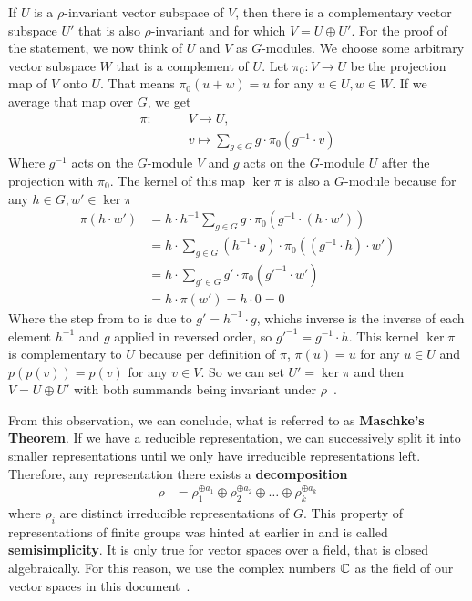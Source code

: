 If $U$ is a $\rho$-invariant vector subspace of $V$, then there is a complementary vector subspace $U'$ that is also $\rho$-invariant and for which $V = U \oplus U'$.
For the proof of the statement, we now think of $U$ and $V$ as $G$-modules.
We choose some arbitrary vector subspace $W$ that is a complement of $U$.
Let $\pi_0: V \to U$ be the projection map of $V$ onto $U$.
That means $\pi_0(u + w) = u$ for any $u \in U, w \in W$.
If we average that map over $G$, we get
\begin{subequations}
\begin{align}
    \pi: \qquad & V \to U, \\
    & v \mapsto \sum_{g \in G} g \cdot \pi_0(g^{-1} \cdot v)
\end{align}
\end{subequations}
Where $g^{-1}$ acts on the $G$-module $V$ and $g$ acts on the $G$-module $U$ after the projection with $\pi_0$.
The kernel of this map $\ker \pi$ is also a $G$-module because for any $h \in G, w' \in \ker \pi$
\begin{subequations}
\begin{align}
    \pi(h \cdot w') & = h \cdot h^{-1} \sum_{g \in G} g \cdot \pi_0(g^{-1} \cdot (h \cdot w')) \\
    & = h \cdot \sum_{g \in G} (h^{-1} \cdot g) \cdot \pi_0((g^{-1} \cdot h) \cdot w') \label{equ:proof.maschke.hg} \\
    & = h \cdot \sum_{g' \in G} g' \cdot \pi_0(g'^{-1} \cdot w') \label{equ:proof.maschke.gprime} \\
    & = h \cdot \pi(w') = h \cdot 0 = 0
\end{align}
\end{subequations}
Where the step from  to  is due to $g' = h^{-1} \cdot g$, whichs inverse is the inverse of each element $h^{-1}$ and $g$ applied in reversed order, so $g'^{-1} = g^{-1} \cdot h$.
This kernel $\ker \pi$ is complementary to $U$ because per definition of $\pi$, $\pi(u) = u$ for any $u \in U$ and $p(p(v)) = p(v)$ for any $v \in V$.
So we can set $U' = \ker \pi$ and then $V = U \oplus U'$ with both summands being invariant under $\rho$~\cite{fulton2013}.

From this observation, we can conclude, what is referred to as \textbf{Maschke's Theorem}.
If we have a reducible representation, we can successively split it into smaller representations until we only have irreducible representations left.
Therefore, any representation there exists a \textbf{decomposition}
\begin{align}
    \rho & = \rho_1^{\oplus a_1} \oplus \rho_2^{\oplus a_2} \oplus \ldots \oplus \rho_k^{\oplus a_k} 
\end{align}
where $\rho_i$ are distinct irreducible representations of $G$.
This property of representations of finite groups was hinted at earlier in  and is called \textbf{semisimplicity}.
It is only true for vector spaces over a field, that is closed algebraically.
For this reason, we use the complex numbers $\mathbb{C}$ as the field of our vector spaces in this document~\cite{fulton2013}. 

